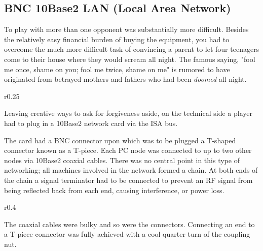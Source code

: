 \subsection{BNC 10Base2 LAN (Local Area Network)}
To play with more than one opponent was substantially more difficult. Besides the relatively easy financial burden of buying the equipment, you had to overcome the much more difficult task of convincing a parent to let four teenagers come to their house where they would scream all night. The famous saying, "fool me once, shame on you; fool me twice, shame on me" is rumored to have originated from betrayed mothers and fathers who had been \textit{doomed} all night.\\
\par



\begin{wrapfigure}[6]{r}{0.25\textwidth}
\centering
{}
\end{wrapfigure}

Leaving creative ways to ask for forgiveness aside, on the technical side a player had to plug in a 10Base2 network card via the ISA bus. \\
\par The card had a BNC connector upon which was to be plugged a T-shaped connector known as a T-piece. Each PC node was connected to up to two other nodes via 10Base2 coaxial cables. There was no central point in this type of networking; all machines involved in the network formed a chain. At both ends of the chain a signal terminator had to be connected to prevent an RF signal from being reflected back from each end, causing interference, or power loss.


\begin{wrapfigure}[8]{r}{0.4\textwidth}
\centering
{}
\end{wrapfigure}
The coaxial cables were bulky and so were the connectors. Connecting an end to a T-piece connector was fully achieved with a cool quarter turn of the coupling nut.\\
\par
 
